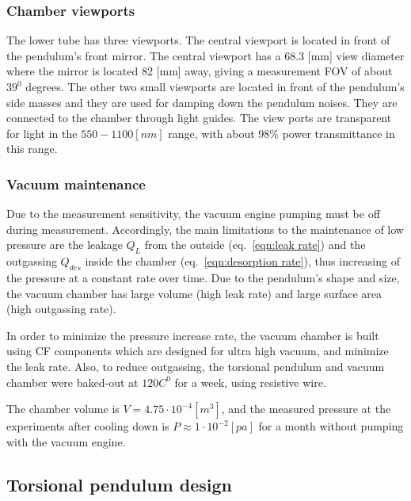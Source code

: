 \documentclass[\main/master.tex]{subfiles}
\begin{document}
\subsubsection{Chamber viewports}
\par\noindent
The lower tube has three viewports. The central viewport is located in front of the pendulum's front mirror. The central viewport has a 68.3 [mm] view diameter where the mirror is located 82 [mm] away, giving a measurement FOV of about $39^0$ degrees. The other two small viewports are located in front of the pendulum's side masses and they are used for damping down the pendulum noises. They are connected to the chamber through light guides. The view ports are transparent for light in the $550-1100 [nm]$ range, with about 98$\%$ power transmittance in this range. 


\subsubsection{Vacuum maintenance}
\par\noindent
Due to the measurement sensitivity, the vacuum engine pumping must be off during measurement. Accordingly, the main limitations to the maintenance of low pressure are the leakage $Q_L$ from the outside (eq.~\ref{eqn:leak rate}) and the outgassing $Q_{des}$ inside the chamber (eq.~\ref{eqn:desorption rate}), thus increasing of the pressure at a constant rate over time. Due to the pendulum's shape and size, the vacuum chamber has large volume (high leak rate) and large surface area (high outgassing rate). 
\par\noindent
In order to minimize the pressure increase rate, the vacuum chamber is built using CF components which are designed for ultra high vacuum, and minimize the leak rate. Also, to reduce outgassing, the torsional pendulum and vacuum chamber were baked-out at $120 C^0$ for a week, using resistive wire. 
\par\noindent
The chamber volume is $V = 4.75\cdot 10^{-4}[m^3]$, and the measured pressure at the experiments after cooling down is $P \approx 1\cdot 10^{−2} [pa]$ for a month without pumping with the vacuum engine.
\subsection{Torsional pendulum design}
\end{document}
